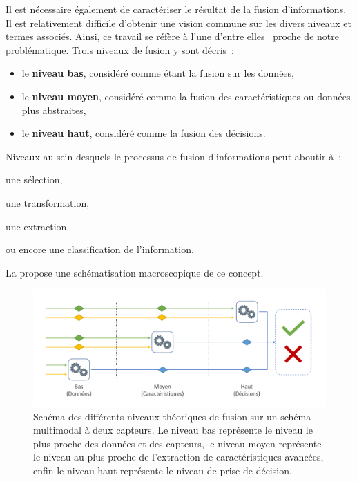 Il est nécessaire également de caractériser le résultat de la fusion d'informations. Il est relativement difficile d'obtenir une vision commune sur les divers niveaux et termes associés. Ainsi, ce travail se réfère à l'une d'entre elles~\cite{Dasarathy1997} proche de notre problématique. Trois niveaux de fusion y sont décris~:
\begin{itemize}
    \item le \textbf{niveau bas}, considéré comme étant la fusion sur les données,
    \item le \textbf{niveau moyen}, considéré comme la fusion des caractéristiques ou données plus abstraites,
    \item le \textbf{niveau haut}, considéré comme la fusion des décisions.
\end{itemize} Niveaux au sein desquels le processus de fusion d'informations peut aboutir à~:
\begin{inlinerate}
    \item une sélection,
    \item une transformation,
    \item une extraction,
    \item ou encore une classification de l'information.
\end{inlinerate} La  propose une schématisation macroscopique de ce concept.\par
 
\begin{figure}[H]
    \centering
    \includegraphics[width=\linewidth]{contents/chapter_3/resources/scheme_overview_fusion.pdf}
    \caption{Schéma des différents niveaux théoriques de fusion sur un schéma multimodal à deux capteurs. Le niveau bas représente le niveau le plus proche des données et des capteurs, le niveau moyen représente le niveau au plus proche de l'extraction de caractéristiques avancées, enfin le niveau haut représente le niveau de prise de décision.}
    \label{fig:scheme_overview_fusion}
\end{figure}\par

